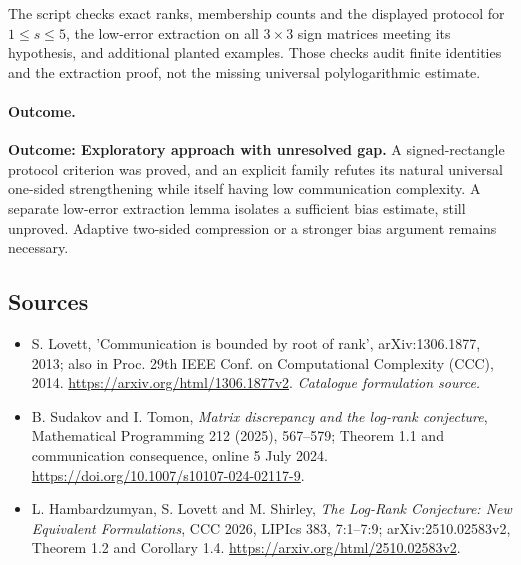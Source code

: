 \documentclass[11pt,a4paper]{article}
\numberwithin{equation}{section}
\begin{document}
The script checks exact ranks, membership counts and the displayed protocol
for $1\le s\le5$, the low-error extraction on all $3\times3$ sign matrices
meeting its hypothesis, and additional planted examples. Those checks audit
finite identities and the extraction proof, not the missing universal
polylogarithmic estimate.

\paragraph{Outcome.}
\textbf{Outcome: Exploratory approach with unresolved gap.}
A signed-rectangle protocol criterion was proved, and an explicit family
refutes its natural universal one-sided strengthening while itself having
low communication complexity. A separate low-error extraction lemma isolates
a sufficient bias estimate, still unproved. Adaptive two-sided compression
or a stronger bias argument remains necessary.

\subsection{Sources}
\begin{itemize}\raggedright
\item[\textnormal{[S1]}]\hypertarget{source:30006402:1}{} S. Lovett, 'Communication is bounded by root of rank', arXiv:1306.1877, 2013; also in Proc. 29th IEEE Conf. on Computational Complexity (CCC), 2014.
\url{https://arxiv.org/html/1306.1877v2}.
{\small\textit{Catalogue formulation source.}}
\item[\textnormal{[E1]}]\hypertarget{extra:30006402:1}{} B. Sudakov and I. Tomon,
\emph{Matrix discrepancy and the log-rank conjecture}, Mathematical Programming
212 (2025), 567--579; Theorem 1.1 and communication consequence, online
5 July 2024. \url{https://doi.org/10.1007/s10107-024-02117-9}.
\item[\textnormal{[E2]}]\hypertarget{extra:30006402:2}{} L. Hambardzumyan, S. Lovett
and M. Shirley, \emph{The Log-Rank Conjecture: New Equivalent Formulations},
CCC 2026, LIPIcs 383, 7:1--7:9; arXiv:2510.02583v2, Theorem 1.2 and
Corollary 1.4. \url{https://arxiv.org/html/2510.02583v2}.

\end{itemize}
\end{document}
